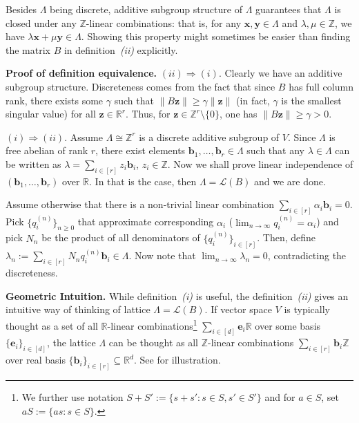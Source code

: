 \documentclass{template}
\begin{document}
Besides $\Lambda$ being discrete, additive subgroup structure of $\Lambda$
guarantees that $\Lambda$ is closed under any $\mathbb{Z}$-linear combinations:
that is, for any $\mathbf{x}, \mathbf{y} \in \Lambda$ and $\lambda, \mu \in
\mathbb{Z}$, we have $\lambda\mathbf{x} + \mu\mathbf{y} \in \Lambda$. Showing
this property might sometimes be easier than finding the matrix $B$ in
definition~\textit{(ii)} explicitly.

\textbf{Proof of definition equivalence.} $(ii) \Rightarrow (i)$. Clearly we
have an additive subgroup structure. Discreteness comes from the fact that since
$B$ has full column rank, there exists some $\gamma$ such that $\|B\mathbf{z}\|
\geq \gamma\|\mathbf{z}\|$ (in fact, $\gamma$ is the smallest singular value)
for all $\mathbf{z} \in \mathbb{R}^r$. Thus, for $\mathbf{z} \in \mathbb{Z}^r
\setminus \{0\}$, one has $\|B\mathbf{z}\| \geq \gamma > 0$. 

$(i) \Rightarrow (ii)$. Assume $\Lambda \cong \mathbb{Z}^r$ is a discrete
additive subgroup of $V$. Since $\Lambda$ is free abelian of rank $r$, there
exist elements $\mathbf{b}_1,\dots,\mathbf{b}_r \in \Lambda$ such that any
$\lambda \in \Lambda$ can be written as $\lambda = \sum_{i \in
[r]}z_i\mathbf{b}_i$, $z_i \in \mathbb{Z}$. Now we shall prove linear
independence of $(\mathbf{b}_1,\dots,\mathbf{b}_r)$ over $\mathbb{R}$. 
In that is the case, then $\Lambda = \mathcal{L}(B)$ and we are done.

Assume otherwise that there is a non-trivial linear combination $\sum_{i \in
[r]}\alpha_i\mathbf{b}_i=0$. Pick $\{q_i^{(n)}\}_{n \geq 0}$ that approximate
corresponding $\alpha_i$ ($\lim_{n \to \infty}q_i^{(n)} = \alpha_i$) and pick
$N_n$ be the product of all denominators of $\{q_i^{(n)}\}_{i \in [r]}$. Then,
define $\lambda_n := \sum_{i \in [r]}N_nq_i^{(n)}\mathbf{b}_i \in \Lambda$. Now
note that $\lim_{n \to \infty}\lambda_n = 0$, contradicting the discreteness. 

\textbf{Geometric Intuition.} While definition~\textit{(i)} is useful, the
definition~\textit{(ii)} gives an intuitive way of thinking of lattice $\Lambda
= \mathcal{L}(B)$. If vector space $V$ is typically thought as a set of all
$\mathbb{R}$-linear combinations\footnote{We further use notation $S+S':=\{s+s':
s \in S, s' \in S'\}$ and for $a \in S$, set $aS := \{as: s \in S\}$.} $\sum_{i
\in [d]}\mathbf{e}_i\mathbb{R}$ over some basis $\{\mathbf{e}_i\}_{i \in [d]}$,
the lattice $\Lambda$ can be thought as all $\mathbb{Z}$-linear combinations
$\sum_{i \in [r]}\mathbf{b}_i\mathbb{Z}$ over real basis $\{\mathbf{b}_i\}_{i
\in [r]} \subseteq \mathbb{R}^d$. See  for illustration.
\end{document}
